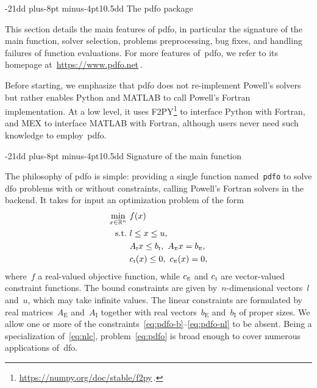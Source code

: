\documentclass[
    smallextended,  %
    final,          %
]{svjour3}
\makeatletter
\newcommand{\R}{\mathbb{R}}
\newcommand{\st}{\text{s.t.}}
\newcommand{\aeq}{A_{\scriptscriptstyle\text{E}}}
\newcommand{\aub}{A_{\scriptscriptstyle\text{I}}}
\newcommand{\beq}{b_{\scriptscriptstyle\text{E}}}
\newcommand{\bub}{b_{\scriptscriptstyle\text{I}}}
\newcommand{\con}[1][i]{c\ifthenelse{\equal{#1}{}}{}{_{#1}}}
\newcommand{\ceq}{\con[\scriptscriptstyle{\text{E}}]}
\newcommand{\cub}{\con[\scriptscriptstyle\text{I}]}
\newcommand{\obj}{f}
\newcommand{\xl}{l}
\newcommand{\xu}{u}
\newcommand{\pdfofun}{\texttt{pdfo}\xspace}
\def\section{\@startsection{section}{1}{\z@}%
    {-21dd plus-8pt minus-4pt}{10.5dd}
    {\sffamily\normalsize\bfseries\boldmath}}
\def\subsection{\@startsection{subsection}{2}{\z@}%
    {-21dd plus-8pt minus-4pt}{10.5dd}
    {\sffamily\normalsize\bfseries}}
\makeatother
\begin{document}
\section{The \texorpdfstring{\gls{pdfo}}{PDFO} package}
\label{sec:pdfo}

This section details the main features of \gls{pdfo}, in particular the signature of the main function, solver selection, problems preprocessing, bug fixes, and handling failures of function evaluations.
For more features of~\gls{pdfo}, we refer to its homepage at~\url{https://www.pdfo.net}\,.

Before starting, we emphasize that \gls{pdfo} does not re-implement Powell's solvers but rather enables Python and MATLAB to call Powell's Fortran implementation.
At a low level, it uses F2PY\footnote{\url{https://numpy.org/doc/stable/f2py}\,.} to interface Python with Fortran, and MEX to interface MATLAB with Fortran, although users never need such knowledge to employ~\gls{pdfo}.

\subsection{Signature of the main function}

The philosophy of \gls{pdfo} is simple: providing a single function named~\pdfofun to solve \gls{dfo} problems with or without constraints, calling Powell's Fortran solvers in the backend.
It takes for input an optimization problem of the form
\begin{subequations}
    \label{eq:pdfo}
    \begin{align}
        \min_{x \in \R^n}   & ~ \obj(x)\\
        \st                 & ~ \xl \le x \le \xu, \label{eq:pdfo-b}\\
                            & ~ \aub x \le \bub, ~ \aeq x = \beq, \label{eq:pdfo-l}\\
                            & ~ \cub(x) \le 0, ~ \ceq(x) = 0, \label{eq:pdfo-nl}
    \end{align}
\end{subequations}
where~$\obj$ a real-valued objective function, while $\ceq$ and $\cub$ are vector-valued constraint functions.
The bound constraints are given by~$n$-dimensional vectors~$\xl$ and~$\xu$, which may take infinite values.
The linear constraints are formulated by real matrices~$\aeq$ and~$\aub$ together with real vectors~$\beq$ and~$\bub$ of proper sizes.
We allow one or more of the constraints~\eqref{eq:pdfo-b}--\eqref{eq:pdfo-nl} to be absent.
Being a specialization of~\eqref{eq:nlc}, problem~\eqref{eq:pdfo} is broad enough to cover numerous applications of~\gls{dfo}.
\end{document}
